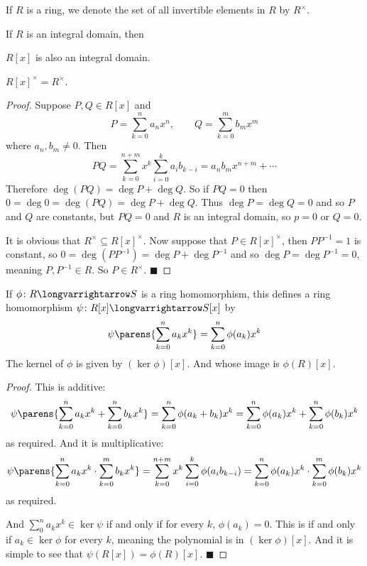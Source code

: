 \documentclass[10pt]{article}
\let\longto=\longvarrightarrow
\def\qed{\hskip1cm\hbox{}\hfill$\blacksquare$}
\begin{document}
\begin{defn*}

    If $R$ is a ring, we denote the set of all invertible elements in $R$ by $R^\times$.

\end{defn*}

\begin{prop*}

    If $R$ is an integral domain, then
    \benum
        \item $R[x]$ is also an integral domain.
        \item $R[x]^\times=R^\times$.
    \eenum

\end{prop*}

\begin{proof}

    \benum
        \item Suppose $P,Q\in R[x]$ and
            \[ P = \sum_{k=0}^n a_nx^n,\qquad Q = \sum_{k=0}^m b_mx^m \]
            where $a_n,b_m\neq0$.
            Then
            \[ PQ = \sum_{k=0}^{n+m}x^k\sum_{i=0}^k a_ib_{k-i} = a_nb_mx^{n+m} + \cdots \]
            Therefore $\deg(PQ)=\deg P+\deg Q$.
            So if $PQ=0$ then $0=\deg0=\deg(PQ)=\deg P+\deg Q$.
            Thus $\deg P=\deg Q=0$ and so $P$ and $Q$ are constants, but $PQ=0$ and $R$ is an integral domain, so $p=0$ or $Q=0$.

        \item It is obvious that $R^\times\subseteq R[x]^\times$.
            Now suppose that $P\in R[x]^\times$, then $PP^{-1}=1$ is constant, so $0=\deg(PP^{-1})=\deg P+\deg P^{-1}$ and so $\deg P=\deg P^{-1}=0$, meaning $P,P^{-1}\in R$.
            So $P\in R^\times$.
            \qed
    \eenum

\end{proof}

\begin{lemm*}

    If $\phi\colon R\longto S$ is a ring homomorphism, this defines a ring homomorphism $\psi\colon R[x]\longto S[x]$ by
    \[ \psi\parens{\sum_{k=0}^n a_kx^k} = \sum_{k=0}^n \phi(a_k)x^k \]
    The kernel of $\phi$ is given by $(\ker\phi)[x]$.
    And whose image is $\phi(R)[x]$.

\end{lemm*}

\begin{proof}

    This is additive:
    \[ \psi\parens{\sum_{k=0}^n a_kx^k + \sum_{k=0}^n b_kx^k} = \sum_{k=0}^n \phi(a_k+b_k)x^k = \sum_{k=0}^n \phi(a_k)x^k + \sum_{k=0}^n \phi(b_k)x^k \]
    as required.
    And it is multiplicative:
    \[ \psi\parens{\sum_{k=0}^n a_kx^k \cdot \sum_{k=0}^m b_kx^k} = \sum_{k=0}^{n+m} x^k\sum_{i=0}^k \phi(a_ib_{k-i}) = \sum_{k=0}^n \phi(a_k)x^k\cdot\sum_{k=0}^m\phi(b_k)x^k \]
    as required.

    And $\sum_0^n a_kx^k\in\ker\psi$ if and only if for every $k$, $\phi(a_k)=0$.
    This is if and only if $a_k\in\ker\phi$ for every $k$, meaning the polynomial is in $(\ker\phi)[x]$.
    And it is simple to see that $\psi(R[x])=\phi(R)[x]$.
    \qed

\end{proof}
\end{document}
